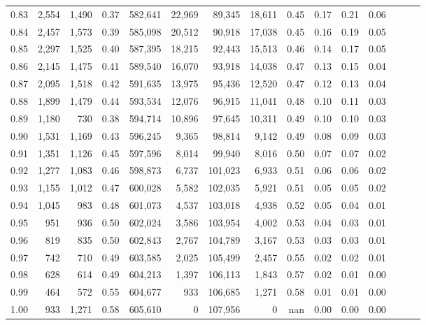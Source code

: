 \begin{tabular}{rrrrrrrrrrrrrrr}
0.83 &   2,554 &  1,490 &  0.37 &  582,641 &   22,969 &   89,345 &   18,611 &  0.45 &  0.17 &  0.21 &      0.06 \\
0.84 &   2,457 &  1,573 &  0.39 &  585,098 &   20,512 &   90,918 &   17,038 &  0.45 &  0.16 &  0.19 &      0.05 \\
0.85 &   2,297 &  1,525 &  0.40 &  587,395 &   18,215 &   92,443 &   15,513 &  0.46 &  0.14 &  0.17 &      0.05 \\
0.86 &   2,145 &  1,475 &  0.41 &  589,540 &   16,070 &   93,918 &   14,038 &  0.47 &  0.13 &  0.15 &      0.04 \\
0.87 &   2,095 &  1,518 &  0.42 &  591,635 &   13,975 &   95,436 &   12,520 &  0.47 &  0.12 &  0.13 &      0.04 \\
0.88 &   1,899 &  1,479 &  0.44 &  593,534 &   12,076 &   96,915 &   11,041 &  0.48 &  0.10 &  0.11 &      0.03 \\
0.89 &   1,180 &    730 &  0.38 &  594,714 &   10,896 &   97,645 &   10,311 &  0.49 &  0.10 &  0.10 &      0.03 \\
0.90 &   1,531 &  1,169 &  0.43 &  596,245 &    9,365 &   98,814 &    9,142 &  0.49 &  0.08 &  0.09 &      0.03 \\
0.91 &   1,351 &  1,126 &  0.45 &  597,596 &    8,014 &   99,940 &    8,016 &  0.50 &  0.07 &  0.07 &      0.02 \\
0.92 &   1,277 &  1,083 &  0.46 &  598,873 &    6,737 &  101,023 &    6,933 &  0.51 &  0.06 &  0.06 &      0.02 \\
0.93 &   1,155 &  1,012 &  0.47 &  600,028 &    5,582 &  102,035 &    5,921 &  0.51 &  0.05 &  0.05 &      0.02 \\
0.94 &   1,045 &    983 &  0.48 &  601,073 &    4,537 &  103,018 &    4,938 &  0.52 &  0.05 &  0.04 &      0.01 \\
0.95 &     951 &    936 &  0.50 &  602,024 &    3,586 &  103,954 &    4,002 &  0.53 &  0.04 &  0.03 &      0.01 \\
0.96 &     819 &    835 &  0.50 &  602,843 &    2,767 &  104,789 &    3,167 &  0.53 &  0.03 &  0.03 &      0.01 \\
0.97 &     742 &    710 &  0.49 &  603,585 &    2,025 &  105,499 &    2,457 &  0.55 &  0.02 &  0.02 &      0.01 \\
0.98 &     628 &    614 &  0.49 &  604,213 &    1,397 &  106,113 &    1,843 &  0.57 &  0.02 &  0.01 &      0.00 \\
0.99 &     464 &    572 &  0.55 &  604,677 &      933 &  106,685 &    1,271 &  0.58 &  0.01 &  0.01 &      0.00 \\
1.00 &     933 &  1,271 &  0.58 &  605,610 &        0 &  107,956 &        0 &   nan &  0.00 &  0.00 &      0.00 \\
\bottomrule
\end{tabular}
